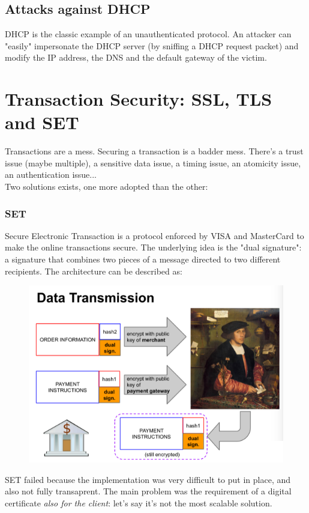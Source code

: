 \documentclass{article}
\begin{document}
			\subsection{Attacks against DHCP}
				DHCP is the classic example of an unauthenticated protocol. An attacker can "easily" impersonate the DHCP server (by sniffing a DHCP request packet) and modify the IP address, the DNS and the default gateway of the victim. 
	
		\section{Transaction Security: SSL, TLS and SET}
			Transactions are a mess. Securing a transaction is a badder mess. There's a trust issue (maybe multiple), a sensitive data issue, a timing issue, an atomicity issue, an authentication issue...\\
			Two solutions exists, one more adopted than the other:
			
			\subsubsection{SET}
				Secure Electronic Transaction is a protocol enforced by VISA and MasterCard to make the online transactions secure. The underlying idea is the "dual signature": a signature that combines two pieces of a message directed to two different recipients. The architecture can be described as:
				\begin{figure}[H]
					\centering
					\includegraphics[width = \textwidth]{./images/SET.png}
				\end{figure}
				SET failed because the implementation was very difficult to put in place, and also not fully transaprent. The main problem was the requirement of a digital certificate \emph{also for the client}: let's say it's not the most scalable solution. 
				
\end{document}
